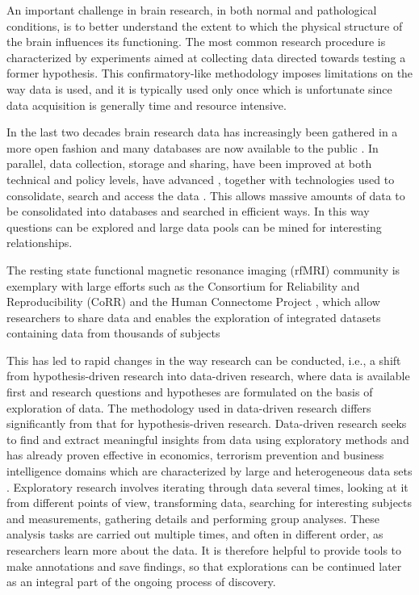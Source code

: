 \documentclass{frontiersHLTH}
\begin{document}
An important challenge in brain research, in both normal and pathological conditions, is to better understand the extent to which the physical structure of the brain influences its functioning. The most common research procedure is characterized by experiments aimed at collecting data directed towards testing a former hypothesis. This confirmatory-like methodology imposes limitations on the way data is used, and it is typically used only once which is unfortunate since data acquisition is generally time and resource intensive.


In the last two decades brain research data has increasingly been gathered in a more open fashion and many databases are now available to the public \cite{milham_open_2012}. In parallel, data collection, storage and sharing, have been improved at both technical and policy levels, have advanced \cite{eckersley_neuroscience_2003}, together with technologies used to consolidate, search and access the data \cite{van_horn_is_2009,wood_harnessing_2014}. This allows massive amounts of data to be consolidated into databases and searched in efficient ways. In this way questions can be explored and large data pools can be mined for interesting relationships.

The resting state functional magnetic resonance imaging (rfMRI) community is exemplary with large efforts such as the Consortium for Reliability and Reproducibility (CoRR) \cite{zuo_test-retest_2014} and the Human Connectome Project \cite{marcus_human_2013, hodge_connectomedbsharing_2016}, which allow researchers to share data and enables the exploration of integrated datasets containing data from thousands of subjects

This has led to rapid changes in the way research can be conducted, i.e., a shift from hypothesis-driven research into data-driven research, where data is available first and research questions and hypotheses are formulated on the basis of exploration of data. The methodology used in data-driven research differs significantly from that for hypothesis-driven research. Data-driven research seeks to find and extract meaningful insights from data using exploratory methods \cite{tukey_we_1980} and has already proven effective in economics, terrorism prevention and business intelligence domains which are characterized by large and heterogeneous data sets \cite{cook_illuminating_2005}. Exploratory research involves iterating through data several times, looking at it from different points of view, transforming data, searching for interesting subjects and measurements, gathering details and performing group analyses. These analysis tasks are carried out multiple times, and often in different order, as researchers learn more about the data. It is therefore helpful to provide tools to make annotations and save findings, so that explorations can be continued later as an integral part of the ongoing process of discovery.
\end{document}

